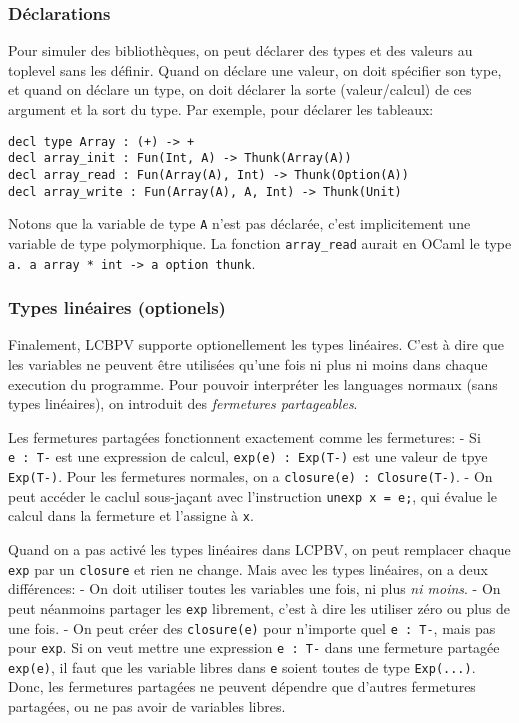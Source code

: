 \documentclass[
]{article}
\begin{document}
\hypertarget{duxe9clarations}{%
\subsubsection{Déclarations}\label{duxe9clarations}}

Pour simuler des bibliothèques, on peut déclarer des types et des
valeurs au toplevel sans les définir. Quand on déclare une valeur, on
doit spécifier son type, et quand on déclare un type, on doit déclarer
la sorte (valeur/calcul) de ces argument et la sort du type. Par
exemple, pour déclarer les tableaux:

\begin{verbatim}
decl type Array : (+) -> +
decl array_init : Fun(Int, A) -> Thunk(Array(A))
decl array_read : Fun(Array(A), Int) -> Thunk(Option(A))
decl array_write : Fun(Array(A), A, Int) -> Thunk(Unit)
\end{verbatim}

Notons que la variable de type \texttt{A} n'est pas déclarée, c'est
implicitement une variable de type polymorphique. La fonction
\texttt{array\_read} aurait en OCaml le type
\texttt{\textquotesingle{}a.\ \textquotesingle{}a\ array\ *\ int\ -\textgreater{}\ \textquotesingle{}a\ option\ thunk}.

\hypertarget{types-linuxe9aires-optionels}{%
\subsubsection{Types linéaires
(optionels)}\label{types-linuxe9aires-optionels}}

Finalement, LCBPV supporte optionellement les types linéaires. C'est à
dire que les variables ne peuvent être utilisées qu'une fois ni plus ni
moins dans chaque execution du programme. Pour pouvoir interpréter les
languages normaux (sans types linéaires), on introduit des
\emph{fermetures partageables}.

Les fermetures partagées fonctionnent exactement comme les fermetures: -
Si \texttt{e\ :\ T-} est une expression de calcul,
\texttt{exp(e)\ :\ Exp(T-)} est une valeur de tpye \texttt{Exp(T-)}.
Pour les fermetures normales, on a \texttt{closure(e)\ :\ Closure(T-)}.
- On peut accéder le caclul sous-jaçant avec l'instruction
\texttt{unexp\ x\ =\ e;}, qui évalue le calcul dans la fermeture et
l'assigne à \texttt{x}.

Quand on a pas activé les types linéaires dans LCPBV, on peut remplacer
chaque \texttt{exp} par un \texttt{closure} et rien ne change. Mais avec
les types linéaires, on a deux différences: - On doit utiliser toutes
les variables une fois, ni plus \emph{ni moins}. - On peut néanmoins
partager les \texttt{exp} librement, c'est à dire les utiliser zéro ou
plus de une fois. - On peut créer des \texttt{closure(e)} pour n'importe
quel \texttt{e\ :\ T-}, mais pas pour \texttt{exp}. Si on veut mettre
une expression \texttt{e\ :\ T-} dans une fermeture partagée
\texttt{exp(e)}, il faut que les variable libres dans \texttt{e} soient
toutes de type \texttt{Exp(...)}. Donc, les fermetures partagées ne
peuvent dépendre que d'autres fermetures partagées, ou ne pas avoir de
variables libres.
\end{document}
